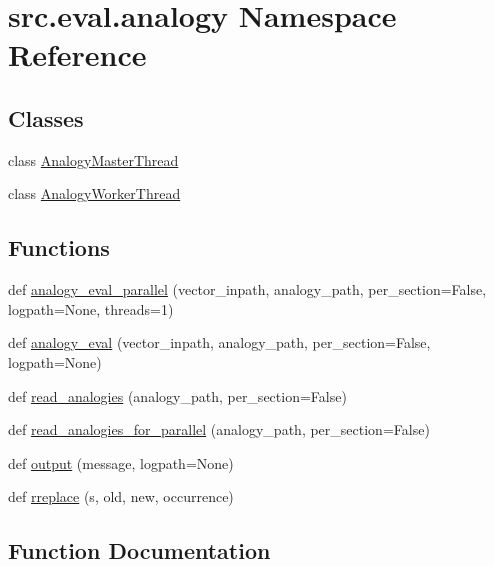 \hypertarget{namespacesrc_1_1eval_1_1analogy}{}\section{src.\+eval.\+analogy Namespace Reference}
\label{namespacesrc_1_1eval_1_1analogy}
\subsection*{Classes}
\begin{DoxyCompactItemize}
\item 
class \hyperlink{classsrc_1_1eval_1_1analogy_1_1_analogy_master_thread}{Analogy\+Master\+Thread}
\item 
class \hyperlink{classsrc_1_1eval_1_1analogy_1_1_analogy_worker_thread}{Analogy\+Worker\+Thread}
\end{DoxyCompactItemize}
\subsection*{Functions}
\begin{DoxyCompactItemize}
\item 
def \hyperlink{namespacesrc_1_1eval_1_1analogy_ab329d7279b400a1d3a8774dc86c94c8f}{analogy\+\_\+eval\+\_\+parallel} (vector\+\_\+inpath, analogy\+\_\+path, per\+\_\+section=False, logpath=None, threads=1)
\item 
def \hyperlink{namespacesrc_1_1eval_1_1analogy_a50e9e7514b6687e8fdde2700363fc4d7}{analogy\+\_\+eval} (vector\+\_\+inpath, analogy\+\_\+path, per\+\_\+section=False, logpath=None)
\item 
def \hyperlink{namespacesrc_1_1eval_1_1analogy_ade7b9f54c3edfb9a2d418c0b39d63e2f}{read\+\_\+analogies} (analogy\+\_\+path, per\+\_\+section=False)
\item 
def \hyperlink{namespacesrc_1_1eval_1_1analogy_a90785f17ab2d275fc18216914fe79e60}{read\+\_\+analogies\+\_\+for\+\_\+parallel} (analogy\+\_\+path, per\+\_\+section=False)
\item 
def \hyperlink{namespacesrc_1_1eval_1_1analogy_ae7d3794d8d951a6dd9652f163af5a19c}{output} (message, logpath=None)
\item 
def \hyperlink{namespacesrc_1_1eval_1_1analogy_aaeab378b9b3988b8fa1c101c227a99d9}{rreplace} (s, old, new, occurrence)
\end{DoxyCompactItemize}


\subsection{Function Documentation}
